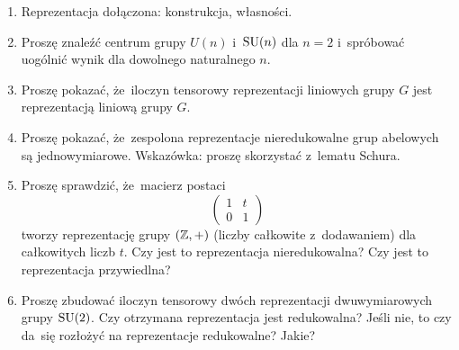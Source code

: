 \documentclass[a4paper,11pt]{article}
\begin{document}
\begin{enumerate}
\item Reprezentacja dołączona: konstrukcja, własności.



\item Proszę znaleźć centrum grupy $U( n )$ i~$\mathrm{SU}( n )$ dla $n = 2$
  i~spróbować uogólnić wynik dla dowolnego naturalnego $n$.



\item Proszę pokazać, że~iloczyn tensorowy reprezentacji liniowych grupy
  $G$ jest reprezentacją liniową grupy $G$.



\item Proszę pokazać, że~zespolona reprezentacje nieredukowalne grup
  abelowych są jednowymiarowe. Wskazówka: proszę skorzystać z~lematu
  Schura.



\item Proszę sprawdzić, że~macierz postaci
  \begin{equation}
    \label{eq:Teoria-grup-ETC-01}
    \begin{pmatrix}
      1 & t \\
      0 & 1
    \end{pmatrix}
  \end{equation}
  tworzy reprezentację grupy $( \mathbb{Z}, + )$ (liczby całkowite z~dodawaniem)
  dla całkowitych liczb $t$. Czy jest to reprezentacja nieredukowalna?
  Czy jest to reprezentacja przywiedlna?



\item Proszę zbudować iloczyn tensorowy dwóch reprezentacji dwuwymiarowych
  grupy $\mathrm{SU}( 2 )$. Czy otrzymana reprezentacja jest redukowalna? Jeśli
  nie, to czy da~się rozłożyć na reprezentacje redukowalne? Jakie?




\end{enumerate}
\end{document}
